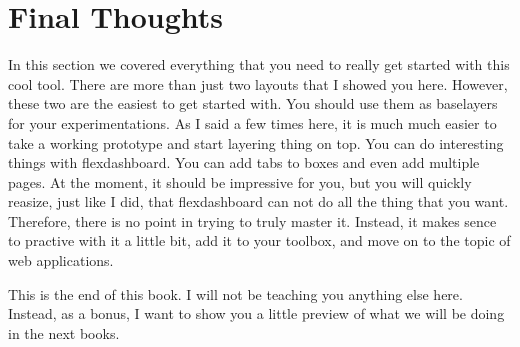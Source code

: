 \documentclass[]{book}
\begin{document}
\hypertarget{final-thoughts}{%
\section{Final Thoughts}\label{final-thoughts}}

In this section we covered everything that you need to really get started with this cool tool. There are more than just two layouts that I showed you here. However, these two are the easiest to get started with. You should use them as baselayers for your experimentations. As I said a few times here, it is much much easier to take a working prototype and start layering thing on top. You can do interesting things with flexdashboard. You can add tabs to boxes and even add multiple pages. At the moment, it should be impressive for you, but you will quickly reasize, just like I did, that flexdashboard can not do all the thing that you want. Therefore, there is no point in trying to truly master it. Instead, it makes sence to practive with it a little bit, add it to your toolbox, and move on to the topic of web applications.

This is the end of this book. I will not be teaching you anything else here. Instead, as a bonus, I want to show you a little preview of what we will be doing in the next books.


\end{document}
